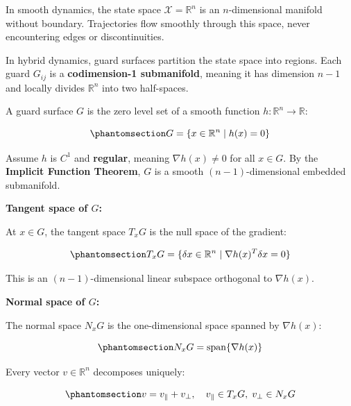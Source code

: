 \documentclass[
  letterpaper,
  DIV=11,
  numbers=noendperiod]{scrartcl}
\begin{document}
In smooth dynamics, the state space \(\mathcal{X} = \mathbb{R}^n\) is an
\(n\)-dimensional manifold without boundary. Trajectories flow smoothly
through this space, never encountering edges or discontinuities.

In hybrid dynamics, guard surfaces partition the state space into
regions. Each guard \(G_{ij}\) is a \textbf{codimension-1 submanifold},
meaning it has dimension \(n-1\) and locally divides \(\mathbb{R}^n\)
into two half-spaces.

\begin{tcolorbox}[enhanced jigsaw, coltitle=black, titlerule=0mm, toprule=.15mm, opacitybacktitle=0.6, left=2mm, opacityback=0, rightrule=.15mm, leftrule=.75mm, breakable, colframe=quarto-callout-tip-color-frame, bottomtitle=1mm, toptitle=1mm, arc=.35mm, title=\textcolor{quarto-callout-tip-color}{\faLightbulb}\hspace{0.5em}{Definition: Guard Surface as Manifold}, bottomrule=.15mm, colback=white, colbacktitle=quarto-callout-tip-color!10!white]

A guard surface \(G\) is the zero level set of a smooth function
\(h: \mathbb{R}^n \to \mathbb{R}\):

\begin{equation}\phantomsection\label{eq-guard-manifold}{
G = \{x \in \mathbb{R}^n \mid h(x) = 0\}
}\end{equation}

Assume \(h\) is \(C^1\) and \textbf{regular}, meaning
\(\nabla h(x) \neq 0\) for all \(x \in G\). By the \textbf{Implicit
Function Theorem}, \(G\) is a smooth \((n-1)\)-dimensional embedded
submanifold.

\textbf{Tangent space of \(G\):}

At \(x \in G\), the tangent space \(T_x G\) is the null space of the
gradient:

\begin{equation}\phantomsection\label{eq-guard-tangent}{
T_x G = \{\delta x \in \mathbb{R}^n \mid \nabla h(x)^T \delta x = 0\}
}\end{equation}

This is an \((n-1)\)-dimensional linear subspace orthogonal to
\(\nabla h(x)\).

\textbf{Normal space of \(G\):}

The normal space \(N_x G\) is the one-dimensional space spanned by
\(\nabla h(x)\):

\begin{equation}\phantomsection\label{eq-guard-normal}{
N_x G = \text{span}\{\nabla h(x)\}
}\end{equation}

Every vector \(v \in \mathbb{R}^n\) decomposes uniquely:

\begin{equation}\phantomsection\label{eq-tangent-normal-decomp}{
v = v_{\parallel} + v_{\perp}, \quad v_{\parallel} \in T_x G, \; v_{\perp} \in N_x G
}\end{equation}

\end{tcolorbox}
\end{document}
